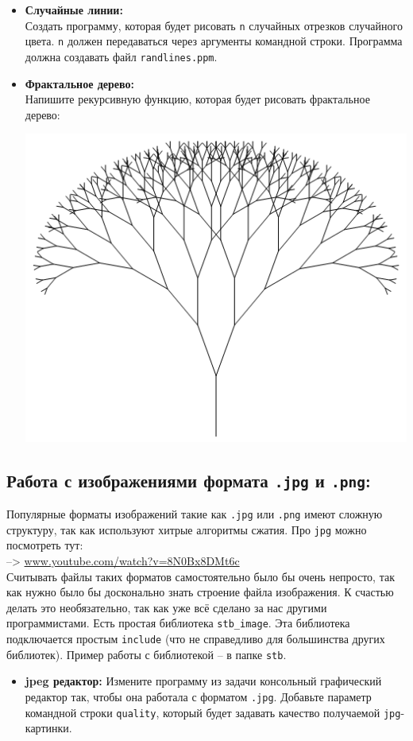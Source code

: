 \documentclass{article}
\begin{document}
\begin{itemize}
\item \textbf{Случайные линии:}\\
Создать программу, которая будет рисовать \texttt{n} случайных отрезков случайного цвета. \texttt{n} должен передаваться через аргументы командной строки. Программа должна создавать файл \texttt{randlines.ppm}.
\item \textbf{Фрактальное дерево:}\\
Напишите рекурсивную функцию, которая будет рисовать фрактальное дерево:
\begin{center}
\includegraphics[scale=0.4]{../images/treefractal.png}
\end{center}
\end{itemize}

\subsection*{Работа с изображениями формата \texttt{.jpg} и \texttt{.png}:}
Популярные форматы изображений такие как \texttt{.jpg} или \texttt{.png} имеют сложную структуру, так как используют хитрые алгоритмы сжатия. Про \texttt{jpg} можно посмотреть тут:\\
 --> \href{https://www.youtube.com/watch?v=8N0Bx8DMt6c}{www.youtube.com/watch?v=8N0Bx8DMt6c}\\
Считывать файлы таких форматов самостоятельно было бы очень непросто, так как нужно было бы досконально знать строение файла изображения. К счастью делать это необязательно, так как уже всё сделано за нас другими программистами. Есть простая библиотека \texttt{stb\_image}. Эта библиотека подключается простым \texttt{include} (что не справедливо для большинства других библиотек). Пример работы с библиотекой -- в папке \texttt{stb}.
\begin{itemize}
\item \textbf{jpeg редактор:} Измените программу из задачи консольный графический редактор так, чтобы она работала с форматом \texttt{.jpg}. Добавьте параметр командной строки \texttt{quality}, который будет задавать качество получаемой \texttt{jpg}-картинки. 
\end{itemize}
\end{document}
